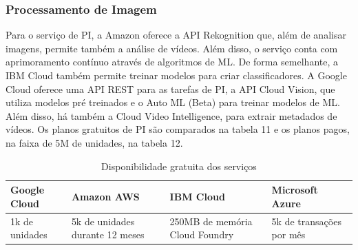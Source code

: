 \documentclass{article}
\begin{document}
\subsubsection{Processamento de Imagem}

Para o serviço de PI, a Amazon oferece a API Rekognition que, além de analisar imagens, permite também a análise de vídeos. Além disso, o serviço conta com aprimoramento contínuo através de algoritmos de ML. De forma semelhante, a IBM Cloud também permite treinar modelos para criar classificadores. A Google Cloud oferece uma API REST para as tarefas de PI, a API Cloud Vision, que utiliza modelos pré treinados e  o Auto ML (Beta) para treinar modelos de ML. Além disso, há também a Cloud Video Intelligence, para extrair metadados de vídeos. Os planos gratuitos de PI são comparados na tabela 11 e os planos pagos, na faixa de 5M de unidades, na tabela 12.

\begin{table}[!!ht]
 \caption{Disponibilidade gratuita dos serviços}
  \centering
  \begin{tabular}{llll}
    \cmidrule(r){1-4}
    Google Cloud & Amazon AWS & IBM Cloud & Microsoft Azure \\
    \midrule
    1k de unidades & 5k de unidades durante 12 meses & 250MB de memória Cloud Foundry & 5k de transações por mês \\
    \bottomrule
  \end{tabular}
  \label{tab:table13}
\end{table}
\end{document}
